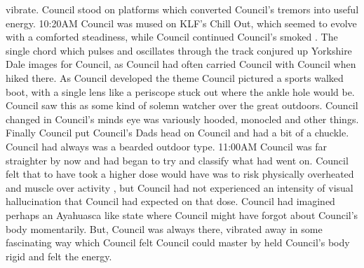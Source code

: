 \documentclass[12pt]{book}
\begin{document}
vibrate. Council stood on platforms which converted Council's tremors into useful energy. 10:20AM Council was mused on KLF's Chill Out, which seemed to evolve with a comforted steadiness, while Council continued Council's smoked . The single chord which pulses and oscillates through the track conjured up Yorkshire Dale images for Council, as Council had often carried Council with Council when hiked there. As Council developed the theme Council pictured a sports walked boot, with a single lens like a periscope stuck out where the ankle hole would be. Council saw this as some kind of solemn watcher over the great outdoors. Council changed in Council's minds eye was variously hooded, monocled and other things. Finally Council put Council's Dads head on Council and had a bit of a chuckle. Council had always was a bearded outdoor type. 11:00AM Council was far straighter by now and had began to try and classify what had went on. Council felt that to have took a higher dose would have was to risk physically overheated and muscle over activity , but Council had not experienced an intensity of visual hallucination that Council had expected on that dose. Council had imagined perhaps an Ayahuasca like state where Council might have forgot about Council's body momentarily. But, Council was always there, vibrated away in some fascinating way which Council felt Council could master by held Council's body rigid and felt the energy.
\end{document}
